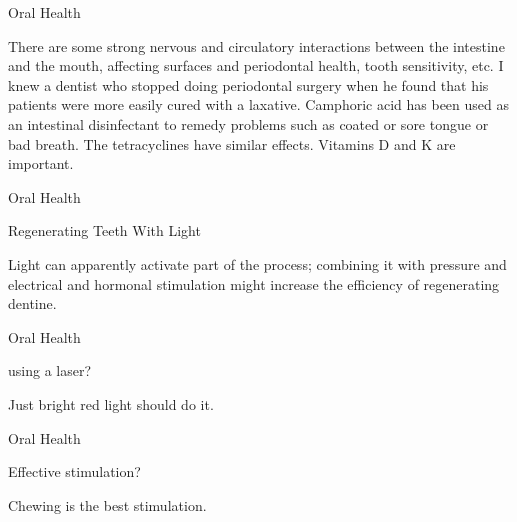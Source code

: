 \documentclass[11pt,oneside,openany,extrafontsizes]{memoir}
\begin{document}
\begin{standalonequote}{Oral Health}

    \begin{answer}
        There are some strong nervous and circulatory interactions between the intestine and the mouth, affecting surfaces and periodontal health, tooth sensitivity, etc. I knew a dentist who stopped doing periodontal surgery when he found that his patients were more easily cured with a laxative. Camphoric acid has been used as an intestinal disinfectant to remedy problems such as coated or sore tongue or bad breath. The tetracyclines have similar effects. Vitamins D and K are important.
    \end{answer}
\end{standalonequote}

\begin{standalonequote}{Oral Health}
    \begin{note}
        Regenerating Teeth With Light
    \end{note}

    \begin{answer}
        Light can apparently activate part of the process; combining it with pressure and electrical and hormonal stimulation might increase the efficiency of regenerating dentine.
    \end{answer}
\end{standalonequote}

\begin{qaexchange}{Oral Health}

    \begin{question}
        using a laser?
    \end{question}

    \begin{answer}
        Just bright red light should do it.
    \end{answer}
\end{qaexchange}

\begin{qaexchange}{Oral Health}

    \begin{question}
        Effective stimulation?
    \end{question}

    \begin{answer}
        Chewing is the best stimulation.
    \end{answer}
\end{qaexchange}
\end{document}
